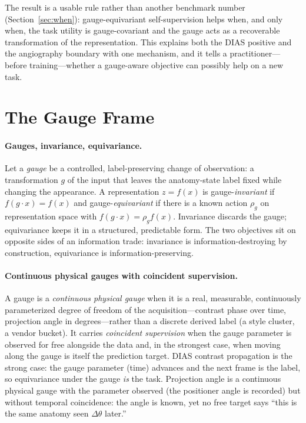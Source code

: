 \documentclass[11pt]{article}
\begin{document}
The result is a usable rule rather than another benchmark number
(Section~\ref{sec:when}): gauge-equivariant self-supervision helps when, and only when, the task
utility is gauge-covariant and the gauge acts as a recoverable transformation of the representation.
This explains both the DIAS positive and the angiography boundary with one mechanism, and it tells a
practitioner---before training---whether a gauge-aware objective can possibly help on a new task.

\section{The Gauge Frame}\label{sec:frame}

\paragraph{Gauges, invariance, equivariance.}
Let a \emph{gauge} be a controlled, label-preserving change of observation: a transformation $g$ of
the input that leaves the anatomy-state label fixed while changing the appearance. A representation
$z=f(x)$ is gauge-\emph{invariant} if $f(g\cdot x)=f(x)$ and gauge-\emph{equivariant} if there is a
known action $\rho_g$ on representation space with $f(g\cdot x)=\rho_g f(x)$. Invariance discards the
gauge; equivariance keeps it in a structured, predictable form. The two objectives sit on opposite
sides of an information trade: invariance is information-destroying by construction, equivariance is
information-preserving.

\paragraph{Continuous physical gauges with coincident supervision.}
A gauge is a \emph{continuous physical gauge} when it is a real, measurable, continuously
parameterized degree of freedom of the acquisition---contrast phase over time, projection angle in
degrees---rather than a discrete derived label (a style cluster, a vendor bucket). It carries
\emph{coincident supervision} when the gauge parameter is observed for free alongside the data and,
in the strongest case, when moving along the gauge is itself the prediction target. DIAS contrast
propagation is the strong case: the gauge parameter (time) advances and the next frame is the label,
so equivariance under the gauge \emph{is} the task. Projection angle is a continuous physical gauge
with the parameter observed (the positioner angle is recorded) but without temporal coincidence: the
angle is known, yet no free target says ``this is the same anatomy seen $\Delta\theta$ later.''
\end{document}
